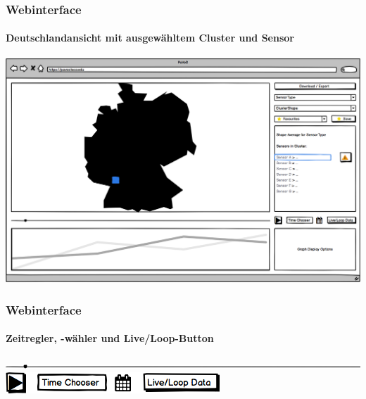 \documentclass{beamer}
\begin{document}
\begin{frame}
	\frametitle{Webinterface}
	\framesubtitle{Deutschlandansicht mit ausgewähltem Cluster und Sensor}
	\centering
	\includegraphics[width=\linewidth]{gui/frontend/FrontGUIGermanyWithShapeSelection}
\end{frame}

\begin{frame}
\frametitle{Webinterface}
\framesubtitle{Zeitregler, -wähler und Live/Loop-Button}
\centering
\includegraphics[width=0.8\linewidth]{gui/frontend/FrontGUITimeSlider}\\[1cm]
\includegraphics[width=0.5\linewidth]{gui/frontend/FrontGUITimeSetter}
\end{frame}
\end{document}

